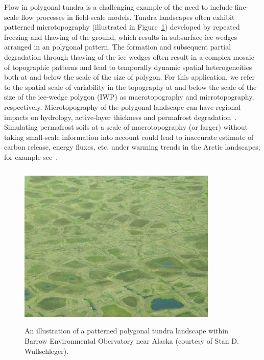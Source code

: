 Flow in polygonal tundra is a challenging example of the need to include fine-scale flow processes in field-scale models.
Tundra landscapes often exhibit patterned microtopography (illustrated in Figure~\ref{tundra-sitesA-B}) developed by repeated freezing and thawing of the ground, which results in subsurface ice wedges arranged in an polygonal pattern.
The formation and subsequent partial degradation through thawing of the ice wedges often result in a complex mosaic of topographic patterns and lead to temporally dynamic spatial heterogeneities both at and below the scale of the size of polygon.
For this application, we refer to the spatial scale of variability in the topography at and below the scale of the size of the ice-wedge polygon (IWP) as macrotopography and microtopography, respectively. 
Microtopography of the polygonal landscape can have regional impacts on hydrology, active-layer thickness and permafrost degradation~\citet{jorgenson2001permafrost,liljedahl2016pan}.
Simulating permafrost soils at a scale of macrotopography (or larger) without taking small-scale information into account could lead to inaccurate estimate of carbon release, energy fluxes, etc. under warming trends in the Arctic landscapes; for example see~\citet{liljedahl2016pan,lu2012modeling,andresen2015disappearing,holden2005peatland}. 
%
\begin{figure}[!h]
\centering
\includegraphics[width=9.5cm, height=8cm]{./figures/polygonal-landscape.jpg}
\caption{An illustration of a patterned polygonal tundra landscape within Barrow Environmental Obervatory near Alaska (courtesy of Stan D. Wullschleger).}
\label{tundra-sitesA-B}
\end{figure}
%

